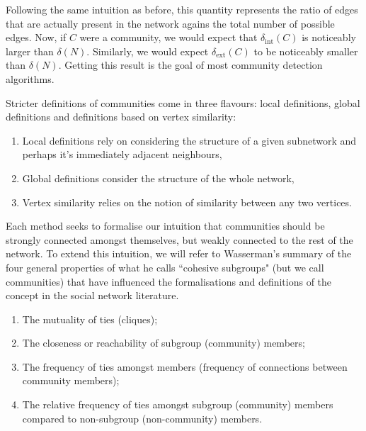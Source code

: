 Following the same intuition as before, this quantity represents the ratio of edges that are actually present in the network agains the total number of possible edges. Now, if $C$ were a community, we would expect that $\delta_{\text{int}}(C)$ is noticeably larger than $\delta(N)$. Similarly, we would expect $\delta_{\text{ext}}(C)$ to be noticeably smaller than $\delta(N)$. Getting this result is the goal of most community detection algorithms.

Stricter definitions of communities come in three flavours: local definitions, global definitions and definitions based on vertex similarity: 

\begin{enumerate}
    \item Local definitions rely on considering the structure of a given subnetwork and perhaps it's immediately adjacent neighbours,
    \item Global definitions consider the structure of the whole network,
    \item Vertex similarity relies on the notion of similarity between any two vertices.
\end{enumerate}

Each method seeks to formalise our intuition that communities should be strongly connected amongst themselves, but weakly connected to the rest of the network. To extend this intuition, we will refer to Wasserman's summary of the four general properties of what he calls ``cohesive subgroups" (but we call communities) that have influenced the formalisations and definitions of the concept in the social network literature.\cite[251-252]{wasserman_faust_1994}

\begin{enumerate}
    \item The mutuality of ties (cliques);
    \item The closeness or reachability of subgroup (community) members;
    \item The frequency of ties amongst members (frequency of connections between community members);
    \item The relative frequency of ties amongst subgroup (community) members compared to non-subgroup (non-community) members.
\end{enumerate}

%

